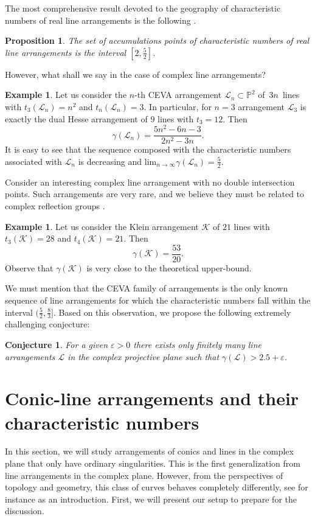 \documentclass{article}
\theoremstyle{plain}
\newtheorem{proposition}[thm]{Proposition}
\newtheorem{conjecture}[thm]{Conjecture}
\theoremstyle{definition}
\newtheorem{example}[thm]{Example}
\numberwithin{equation}{section}
\begin{document}
The most comprehensive result devoted to the geography of characteristic numbers of real line arrangements is the following \cite{EFU}.
\begin{proposition}
The set of accumulations points of characteristic numbers of real line arrangements is the interval $[2, \frac{5}{2}]$.    
\end{proposition}
However, what shall we say in the case of complex line arrangements?
\begin{example}
Let us consider the $n$-th CEVA arrangement $\mathcal{L}_{n} \subset \mathbb{P}^{2}$ of $\, 3n \, $ lines with $t_{3}(\mathcal{L}_{n})=n^{2}$ and $t_{n}(\mathcal{L}_{n})=3$. In particular, for $n=3$ arrangement $\mathcal{L}_{3}$ is exactly the dual Hesse arrangement of $9$ lines with $t_{3}=12$. Then
\[\gamma(\mathcal{L}_{n}) = \frac{5n^2-6n-3}{2n^{2}-3n}.\]
It is easy to see that the sequence composed with the characteristic numbers associated with $\mathcal{L}_{n}$ is decreasing and $\textrm{lim}_{n\rightarrow \infty} \gamma(\mathcal{L}_{n}) = \frac{5}{2}$.
\end{example}
Consider an interesting complex line arrangement with no double intersection points. Such arrangements are very rare, and we believe they must be related to complex reflection groups \cite[Open Problem 1.1.6.]{HarB}.
\begin{example}
Let us consider the Klein arrangement $\mathcal{K}$ of $21$ lines with $t_{3}(\mathcal{K})=28$ and $t_{4}(\mathcal{K})=21$. Then
\[\gamma(\mathcal{K}) = \frac{53}{20}.\]
Observe that $\gamma(\mathcal{K})$ is very close to the theoretical upper-bound.
\end{example}
We must mention that the CEVA family of arrangements is the only known sequence of line arrangements for which the characteristic numbers fall within the interval $(\frac{5}{2}, \frac{8}{3}]$. Based on this observation, we propose the following extremely challenging conjecture:
\begin{conjecture}
For a given $\varepsilon >0$ there exists only finitely many line arrangements $\mathcal{L}$ in the complex projective plane such that $\gamma(\mathcal{L}) > 2.5 + \varepsilon$.
\end{conjecture}


\section{Conic-line arrangements and their characteristic numbers}
In this section, we will study arrangements of conics and lines in the complex plane that only have ordinary singularities. This is the first generalization from line arrangements in the complex plane. However, from the perspectives of topology and geometry, this class of curves behaves completely differently, see for instance \cite{PSz} as an introduction. First, we will present our setup to prepare for the discussion.
\end{document}
